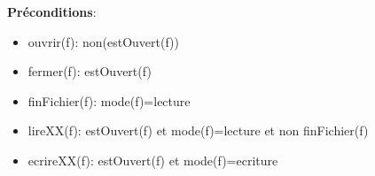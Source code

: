     \textbf{Préconditions}: \begin{itemize}[label=$\- $, leftmargin=2cm, itemsep=0cm]
        \item ouvrir(f): non(estOuvert(f))
        \item fermer(f): estOuvert(f)
        \item finFichier(f): mode(f)=lecture
        \item lireXX(f): estOuvert(f) et mode(f)=lecture et non finFichier(f)
        \item ecrireXX(f): estOuvert(f) et mode(f)=ecriture
    \end{itemize}

